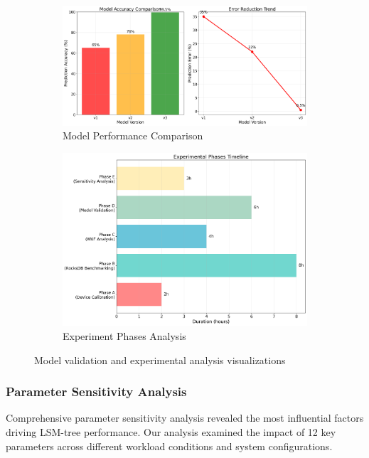 \documentclass[11pt]{article}
\begin{document}
\begin{figure}[H]
\centering
\begin{subfigure}{0.48\textwidth}
\centering
\includegraphics[width=\textwidth]{experiments/2025-09-05/model_comparison_visualization.png}
\caption{Model Performance Comparison}
\label{fig:model_comparison}
\end{subfigure}
\hfill
\begin{subfigure}{0.48\textwidth}
\centering
\includegraphics[width=\textwidth]{experiments/2025-09-05/experiment_phases_visualization.png}
\caption{Experiment Phases Analysis}
\label{fig:experiment_phases}
\end{subfigure}
\caption{Model validation and experimental analysis visualizations}
\end{figure}

\subsubsection{Parameter Sensitivity Analysis}
Comprehensive parameter sensitivity analysis revealed the most influential factors driving LSM-tree performance. Our analysis examined the impact of 12 key parameters across different workload conditions and system configurations.
\end{document}
